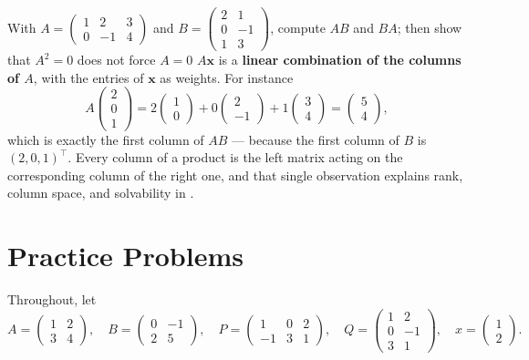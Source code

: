 \begin{worked}{With $A=\begin{pmatrix}1&2&3\\0&-1&4\end{pmatrix}$ and $B=\begin{pmatrix}2&1\\0&-1\\1&3\end{pmatrix}$, compute $AB$ and $BA$; then show that $A^{2}=0$ does not force $A=0$}
$A\mathbf x$ is a \textbf{linear combination of the columns of $A$}, with
the entries of $\mathbf x$ as weights. For instance
\[
  A\begin{pmatrix}2\\0\\1\end{pmatrix}
  =2\begin{pmatrix}1\\0\end{pmatrix}
  +0\begin{pmatrix}2\\-1\end{pmatrix}
  +1\begin{pmatrix}3\\4\end{pmatrix}
  =\begin{pmatrix}5\\4\end{pmatrix},
\]
which is exactly the first column of $AB$ --- because the first column of
$B$ is $(2,0,1)^{\!\top}$. Every column of a product is the left matrix
acting on the corresponding column of the right one, and that single
observation explains rank, column space, and solvability in .
\end{worked}

\section{Practice Problems}

Throughout, let
\[
A = \begin{pmatrix} 1 & 2 \\ 3 & 4 \end{pmatrix}, \quad
B = \begin{pmatrix} 0 & -1 \\ 2 & 5 \end{pmatrix}, \quad
P = \begin{pmatrix} 1 & 0 & 2 \\ -1 & 3 & 1 \end{pmatrix}, \quad
Q = \begin{pmatrix} 1 & 2 \\ 0 & -1 \\ 3 & 1 \end{pmatrix}, \quad x = \begin{pmatrix} 1 \\ 2 \end{pmatrix}.
\]

